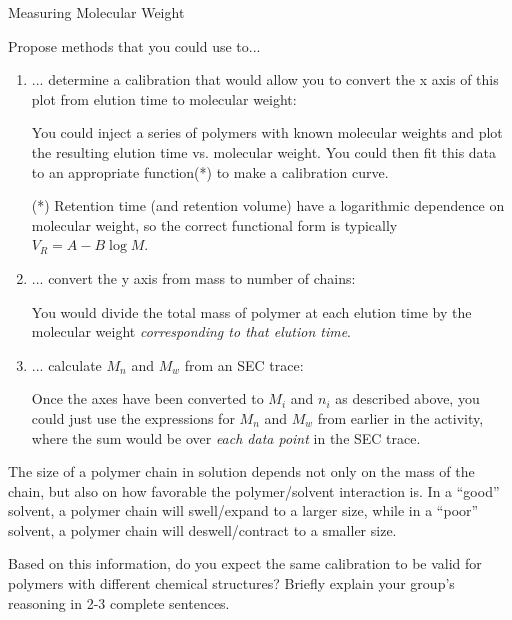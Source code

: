 \begin{activity}{Measuring Molecular Weight}
\begin{ctqs}
	\question Propose methods that you could use to...
	
		\begin{enumerate}
			\item ... determine a calibration that would allow you to convert the x axis of this plot from elution time to molecular weight:
	
				\begin{solution}[1in]
					You could inject a series of polymers with known molecular weights and plot the resulting elution time vs. molecular weight.  You could then fit this data to an appropriate function(*) to make a calibration curve.
					
					(*) Retention time (and retention volume) have a logarithmic dependence on molecular weight, so the correct functional form is typically $V_R = A - B \log M$.
					
				\end{solution}
			
			\item ... convert the y axis from mass to number of chains:
	
				\begin{solution}[1in]
					You would divide the total mass of polymer at each elution time by the molecular weight \emph{corresponding to that elution time}.
				\end{solution}
			
			\item ... calculate $M_n$ and $M_w$ from an SEC trace:
	
				\begin{solution}[1.5in]
					Once the axes have been converted to $M_i$ and $n_i$ as described above, you could just use the expressions for $M_n$ and $M_w$ from earlier in the activity, where the sum would be over \emph{each data point} in the SEC trace.
				\end{solution}
		
		\end{enumerate}
	
	\clearpage
	\question The size of a polymer chain in solution depends not only on the mass of the chain, but also on how favorable the polymer/solvent interaction is.  In a ``good'' solvent, a polymer chain will swell/expand to a larger size, while in a ``poor'' solvent, a polymer chain will deswell/contract to a smaller size.
	
		Based on this information, do you expect the same calibration to be valid for polymers with different chemical structures?  Briefly explain your group's reasoning in 2-3 complete sentences.		
	

\end{ctqs}
\end{activity}
